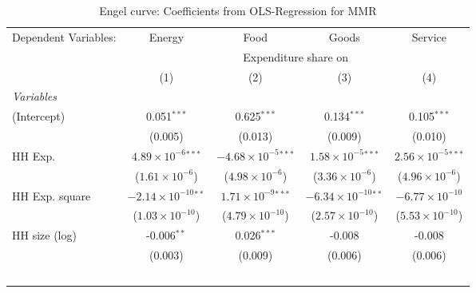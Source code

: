 
\begin{table}[htbp!]
   \centering
   \small
   \begin{adjustbox}{width = 1\textwidth, max height = 0.95\textheight, center}
      \begin{threeparttable}[b]
         \caption{\label{tab:Engel_parametric_MMR} Engel curve: Coefficients from OLS-Regression for MMR}
         \begin{tabular}{lcccc}
            \tabularnewline \midrule \midrule
            Dependent Variables: & Energy                         & Food                           & Goods                          & Service\\  
             & \multicolumn{4}{c}{Expenditure share on} \\ 
                                 & (1)                            & (2)                            & (3)                            & (4)\\  
            \midrule
            \emph{Variables}\\
            (Intercept)          & 0.051$^{***}$                  & 0.625$^{***}$                  & 0.134$^{***}$                  & 0.105$^{***}$\\   
                                 & (0.005)                        & (0.013)                        & (0.009)                        & (0.010)\\   
            HH Exp.              & $4.89\times 10^{-6}$$^{***}$   & $-4.68\times 10^{-5}$$^{***}$  & $1.58\times 10^{-5}$$^{***}$   & $2.56\times 10^{-5}$$^{***}$\\    
                                 & ($1.61\times 10^{-6}$)         & ($4.98\times 10^{-6}$)         & ($3.36\times 10^{-6}$)         & ($4.96\times 10^{-6}$)\\    
            HH Exp. square       & $-2.14\times 10^{-10}$$^{**}$  & $1.71\times 10^{-9}$$^{***}$   & $-6.34\times 10^{-10}$$^{**}$  & $-6.77\times 10^{-10}$\\    
                                 & ($1.03\times 10^{-10}$)        & ($4.79\times 10^{-10}$)        & ($2.57\times 10^{-10}$)        & ($5.53\times 10^{-10}$)\\    
            HH size (log)        & -0.006$^{**}$                  & 0.026$^{***}$                  & -0.008                         & -0.008\\   
                                 & (0.003)                        & (0.009)                        & (0.006)                        & (0.006)\\   
$$
\end{tabular}
\end{threeparttable}
\end{adjustbox}
\end{table}
